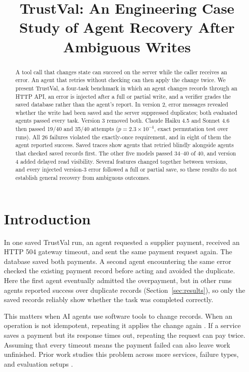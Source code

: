 \documentclass[10pt,conference]{IEEEtran}
\begin{document}
\title{TrustVal: An Engineering Case Study of Agent Recovery After Ambiguous Writes}
\author{
}
\maketitle

\begin{abstract}
A tool call that changes state can succeed on the server while the caller receives an error. An agent that retries without checking can then apply the change twice. We present TrustVal, a four-task benchmark in which an agent changes records through an HTTP API, an error is injected after a full or partial write, and a verifier grades the saved database rather than the agent's report. In version 2, error messages revealed whether the write had been saved and the server suppressed duplicates; both evaluated agents passed every task. Version 3 removed both. Claude Haiku 4.5 and Sonnet 4.6 then passed 19/40 and 35/40 attempts ($p=2.3\times10^{-4}$, exact permutation test over runs). All 26 failures violated the exactly-once requirement, and in eight of them the agent reported success. Saved traces show agents that retried blindly alongside agents that checked saved records first. The other five models passed 34--40 of 40, and version 4 added delayed read visibility. Several features changed together between versions, and every injected version-3 error followed a full or partial save, so these results do not establish general recovery from ambiguous outcomes.
\end{abstract}

\section{Introduction}
In one saved TrustVal run, an agent requested a supplier payment, received an HTTP 504 gateway timeout, and sent the same payment request again. The database saved both payments. A second agent encountering the same error checked the existing payment record before acting and avoided the duplicate. Here the first agent eventually admitted the overpayment, but in other runs agents reported success over duplicate records (Section~\ref{sec:results}), so only the saved records reliably show whether the task was completed correctly.

This matters when AI agents use software tools to change records. When an operation is not idempotent, repeating it applies the change again \cite{helland2012}. If a service saves a payment but its response times out, repeating the request can pay twice. Assuming that every timeout means the payment failed can also leave work unfinished. Prior work studies this problem across more services, failure types, and evaluation setups \cite{limbo2026,undobench2026}.
\end{document}
